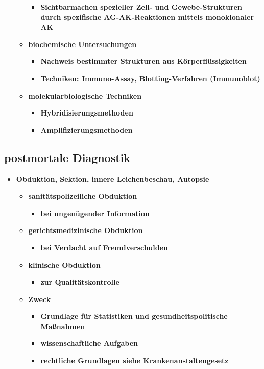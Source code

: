 \begin{itemize}
\begin{itemize}
					\begin{itemize}
						\item \textbf{Sichtbarmachen spezieller Zell- und Gewebe-Strukturen durch spezifische AG-AK-Reaktionen mittels monoklonaler AK}
					\end{itemize}
				\item \textbf{biochemische Untersuchungen}
					\begin{itemize}
						\item \textbf{Nachweis bestimmter Strukturen aus Körperflüssigkeiten}
						\item \textbf{Techniken: Immuno-Assay, Blotting-Verfahren (Immunoblot)}
					\end{itemize}
				\item \textbf{molekularbiologische Techniken}
					\begin{itemize}
						\item \textbf{Hybridisierungsmethoden}
						\item \textbf{Amplifizierungsmethoden}
					\end{itemize}
		\end{itemize}
	\end{itemize}

\pagebreak
\subsection{postmortale Diagnostik}
	\begin{itemize}
		\item \textbf{Obduktion, Sektion, innere Leichenbeschau, Autopsie}
			\begin{itemize}
				\item \textbf{sanitätspolizeiliche Obduktion}
					\begin{itemize}
						\item \textbf{bei ungenügender Information}
					\end{itemize}
				\item \textbf{gerichtsmedizinische Obduktion}
					\begin{itemize}
						\item \textbf{bei Verdacht auf Fremdverschulden}
					\end{itemize}
				\item \textbf{klinische Obduktion}
					\begin{itemize}
						\item \textbf{zur Qualitätskontrolle}
					\end{itemize}
				\item \textbf{Zweck}
					\begin{itemize}
						\item \textbf{Grundlage für Statistiken und gesundheitspolitische Maßnahmen}
						\item \textbf{wissenschaftliche Aufgaben}
						\item \textbf{rechtliche Grundlagen siehe Krankenanstaltengesetz}
					\end{itemize}
			\end{itemize}
	\end{itemize}


